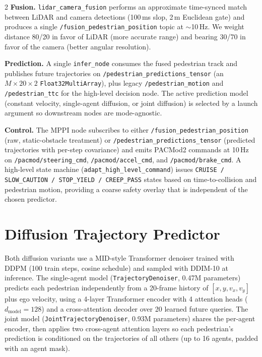 \documentclass[10pt,letterpaper]{article}
\begin{document}
\begin{multicols}{2}
\textbf{Fusion.} \texttt{lidar\_camera\_fusion} performs an approximate
time-synced match between LiDAR and camera detections (100\,ms slop,
2\,m Euclidean gate) and produces a single
\texttt{/fusion\_pedestrian\_position} topic at $\sim$10\,Hz.  We weight
distance 80/20 in favor of LiDAR (more accurate range) and bearing 30/70
in favor of the camera (better angular resolution).

\textbf{Prediction.} A single \texttt{infer\_node} consumes the fused
pedestrian track and publishes future trajectories on
\texttt{/pedestrian\_predictions\_tensor} (an $M{\times}20{\times}2$
\texttt{Float32MultiArray}), plus legacy
\texttt{/pedestrian\_motion} and \texttt{/pedestrian\_ttc} for the
high-level decision node.  The active prediction model (constant
velocity, single-agent diffusion, or joint diffusion) is selected by a
launch argument so downstream nodes are mode-agnostic.

\textbf{Control.} The MPPI node subscribes to either
\texttt{/fusion\_pedestrian\_position} (raw, static-obstacle treatment)
or \texttt{/pedestrian\_predictions\_tensor} (predicted trajectories with
per-step covariance) and emits PACMod2 commands at 10\,Hz on
\texttt{/pacmod/steering\_cmd}, \texttt{/pacmod/accel\_cmd}, and
\texttt{/pacmod/brake\_cmd}.  A high-level state machine
(\texttt{adapt\_high\_level\_command}) issues
\texttt{CRUISE / SLOW\_CAUTION / STOP\_YIELD / CREEP\_PASS} states based
on time-to-collision and pedestrian motion, providing a coarse
safety overlay that is independent of the chosen predictor.

\section{Diffusion Trajectory Predictor}

Both diffusion variants use a MID-style Transformer denoiser trained
with DDPM (100 train steps, cosine schedule) and sampled with DDIM-10 at
inference.  The single-agent model
(\texttt{TrajectoryDenoiser}, 0.47M parameters) predicts each
pedestrian independently from a 20-frame history of $[x,y,v_x,v_y]$
plus ego velocity, using a 4-layer Transformer encoder with 4 attention
heads ($d_{\text{model}}{=}128$) and a cross-attention decoder over 20
learned future queries.  The joint model
(\texttt{JointTrajectoryDenoiser}, 0.93M parameters) shares the
per-agent encoder, then applies two cross-agent attention layers so each
pedestrian's prediction is conditioned on the trajectories of all
others (up to 16 agents, padded with an agent mask).


\end{multicols}
\end{document}
